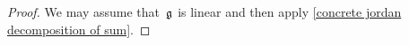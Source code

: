 \begin{proof}
  We may assume that~$\mathfrak{g}$ is linear and then apply \cref{concrete jordan decomposition of sum}.
\end{proof}


% 
%       
%       
%       
